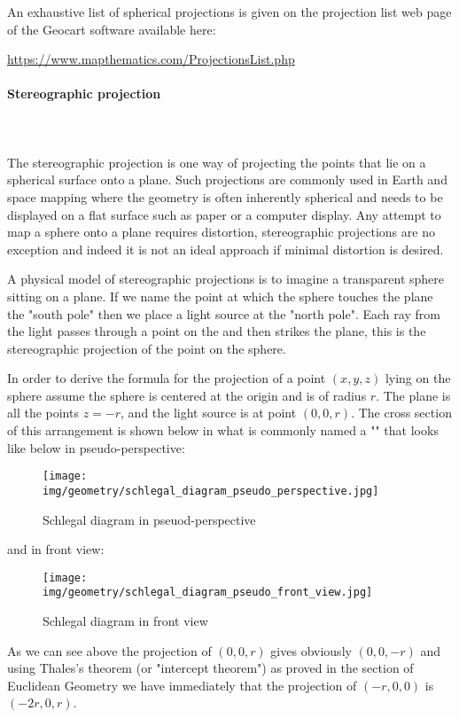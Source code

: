 	\begin{tcolorbox}[title=Remark,colframe=black,arc=10pt]
	An exhaustive list of spherical projections is given on the projection list web page of the Geocart software available here: 	
	\begin{center}
	\url{https://www.mapthematics.com/ProjectionsList.php}
	\end{center}
	\end{tcolorbox}
	
	\paragraph{Stereographic projection}\mbox{}\\\\
	The stereographic projection is one way of projecting the points that lie on a spherical surface onto a plane. Such projections are commonly used in Earth and space mapping where the geometry is often inherently spherical and needs to be displayed on a flat surface such as paper or a computer display. Any attempt to map a sphere onto a plane requires distortion, stereographic projections are no exception and indeed it is not an ideal approach if minimal distortion is desired. 

	A physical model of stereographic projections is to imagine a transparent sphere sitting on a plane. If we name the point at which  the sphere touches the plane the "south pole" then we place a light source at the "north pole". Each ray from the light passes through a point on the and then strikes the plane, this is the stereographic projection of the point on the sphere. 
	
	In order to derive the formula for the projection of a point $(x,y,z)$ lying on the sphere assume the sphere is centered at the origin and is of radius $r$. The plane is all the points $z = -r$, and the light source is at point $(0,0,r)$. The cross section of this arrangement is shown below in what is commonly named a "" that looks like below in pseudo-perspective:
	\begin{figure}[H]
		\centering
		\texttt{[image: img/geometry/schlegal\_diagram\_pseudo\_perspective.jpg]}
		\caption{Schlegal diagram in pseuod-perspective}
	\end{figure}
	and in front view:
	\begin{figure}[H]
		\centering
		\texttt{[image: img/geometry/schlegal\_diagram\_pseudo\_front\_view.jpg]}
		\caption[]{Schlegal diagram in front view}
	\end{figure}
	As we can see above the projection of $(0,0,r)$ gives obviously $(0,0,-r)$ and using Thales's theorem (or "intercept theorem") as proved in the section of Euclidean Geometry we have immediately that the projection of $(-r,0,0)$ is $(-2r,0,r)$.
	
